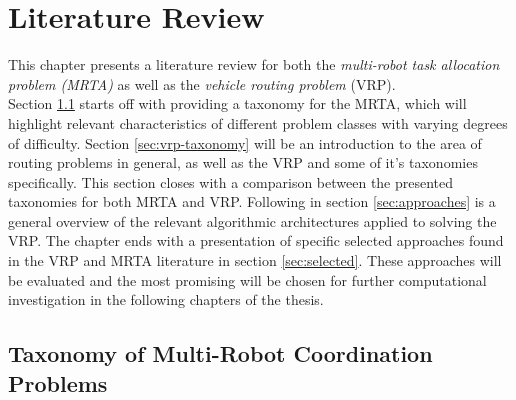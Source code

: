 \chapter{Literature Review} \label{chap:literature}




This chapter presents a literature review for both the \textit{multi-robot task allocation problem (MRTA)} as well as the \textit{vehicle routing problem} (VRP).\\
Section \ref{sec:mrta-taxonomy} starts off with providing a taxonomy for the MRTA, which will highlight relevant characteristics of different problem classes with varying degrees of difficulty. Section \ref{sec:vrp-taxonomy} will be an introduction to the area of routing problems in general, as well as the VRP and some of it's taxonomies specifically. This section closes with a comparison between the presented taxonomies for both MRTA and VRP. %
Following in section \ref{sec:approaches} is a general overview of the relevant algorithmic architectures applied to solving the VRP. The chapter ends with a presentation of specific selected approaches found in the VRP and MRTA literature in section \ref{sec:selected}. These approaches will be evaluated and the most promising will be chosen for further computational investigation in the following chapters of the thesis.

\section{Taxonomy of Multi-Robot Coordination Problems}\label{sec:mrta-taxonomy}

